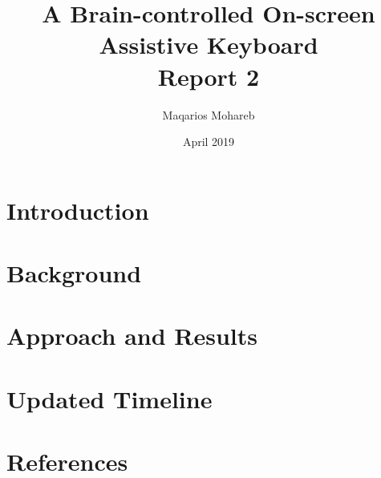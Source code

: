 \documentclass[12pt]{report}
\title{
    {A Brain-controlled On-screen Assistive Keyboard}\\
    {\large Report 2}
}
\author{Maqarios Mohareb}
\date{April 2019}
\begin{document}
\maketitle

\tableofcontents

\chapter{Introduction}


\chapter{Background}


\chapter{Approach and Results}


\chapter{Updated Timeline}


\chapter*{References}

\end{document}
